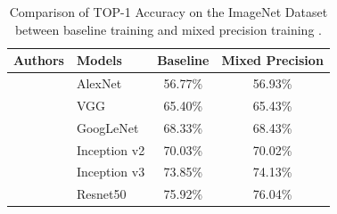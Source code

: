 %
%
%
%
%





\begin{table}[t]
  \centering
  {\small
  \begin{tabular}{llcc}
    \toprule
    \textbf{Authors} & \textbf{Models} & \textbf{Baseline} & \textbf{Mixed Precision} \\
    \midrule
    \citet{krizhevsky2012imagenet} & AlexNet & 56.77\% & 56.93\% \\
    \citet{simonyan2014very} & VGG & 65.40\% & 65.43\% \\
    \citet{szegedy2015going} & GoogLeNet & 68.33\% & 68.43\% \\
    \citet{ioffe2015batch} & Inception v2 & 70.03\% & 70.02\% \\
    \citet{szegedy2016rethinking} & Inception v3 & 73.85\% & 74.13\% \\
    \citet{he2016deep} & Resnet50 & 75.92\% & 76.04\% \\
    \bottomrule
  \end{tabular}
  }
  \caption{Comparison of TOP-1 Accuracy on the ImageNet Dataset \cite{deng2009imagenet} between baseline training and mixed precision training \cite{micikevicius2018mixed}.}
  \label{table:p1-ch3-basline_vs_mixed_precision}
\end{table}


